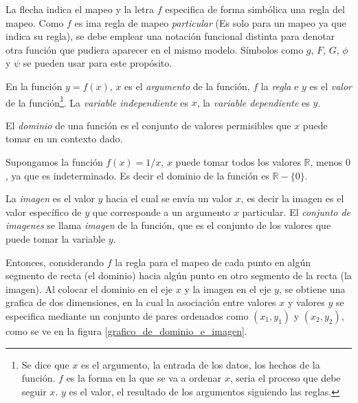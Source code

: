 La flecha indica el mapeo y la letra \(f\) especifica de forma simbólica una regla del mapeo. Como \(f\) es ima regla de mapeo \textit{particular} (Es solo para un mapeo ya que indica su regla), se debe emplear una notación funcional distinta para denotar otra función que pudiera aparecer en el mismo modelo.
Símbolos como \(g\), \(F\), \(G\), \(\phi\) y \(\psi\) se pueden usar para este propósito. 

En la función \(y=f(x)\), \(x\) es el \textit{argumento} de la función, \(f\) la \textit{regla} e \(y\) es el \textit{valor} de la función\footnote{Se dice que \(x\) es el argumento, la entrada de los datos, los hechos de la función. \(f\) es la forma en la que se va a ordenar \(x\), seria el proceso que debe seguir \(x\). \(y\) es el valor, el resultado de los argumentos siguiendo las reglas.}.
La \textit{variable independiente} es \(x\), la \textit{variable dependiente} es \(y\).

El \textit{dominio} de una función es el conjunto de valores permisibles que \(x\) puede tomar en un contexto dado. 
\begin{ejemplo}
    Supongamos la función \(f(x)=1/x\), \(x\) puede tomar todos los valores \(\mathbb{R}\), menos \(0\), ya que es indeterminado. Es decir el dominio de la función es \(\mathbb{R}-\{0\}\).
\end{ejemplo}
La \textit{imagen} es el valor \(y\) hacia el cual se envía un valor \(x\), es decir la imagen es el valor específico de \(y\) que corresponde a un argumento \(x\) particular.
El \textit{conjunto de imagenes} se llama \textit{imagen} de la función, que es el conjunto de los valores que puede tomar la variable \(y\).

Entonces, considerando \(f\) la regla para el mapeo de cada punto en algún segmento de recta (el dominio) hacia algún punto en otro segmento de la recta (la imagen). Al colocar el dominio en el eje \(x\) y la imagen en el eje \(y\), se obtiene una grafica de dos dimensiones, en la cual la asociación entre valores \(x\) y valores \(y\) se especifica mediante un conjunto de pares ordenados como \((x_1,y_1)\) y \((x_2,y_2)\), como se ve en la figura \ref{grafico_de_dominio_e_imagen}.

